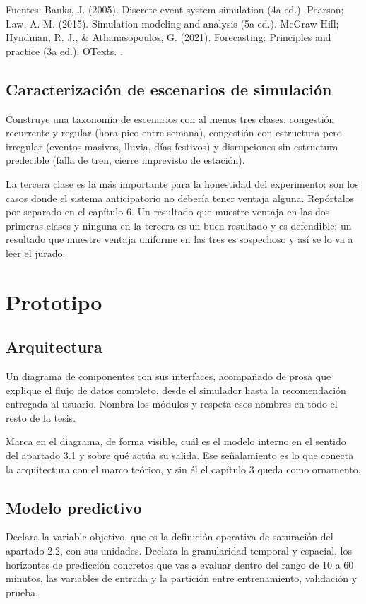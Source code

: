 \documentclass[letterpaper,12pt,oneside]{book}
\theoremstyle{definition}
\theoremstyle{plain}
\theoremstyle{remark}
\begin{document}
Fuentes: Banks, J. (2005). Discrete-event system simulation (4a ed.). Pearson; Law, A. M. (2015). Simulation modeling and analysis (5a ed.). McGraw-Hill; Hyndman, R. J., \& Athanasopoulos, G. (2021). Forecasting: Principles and practice (3a ed.). OTexts.
.
\section{Caracterización de escenarios de simulación}

Construye una taxonomía de escenarios con al menos tres clases: congestión recurrente y regular (hora pico entre semana), congestión con estructura pero irregular (eventos masivos, lluvia, días festivos) y disrupciones sin estructura predecible (falla de tren, cierre imprevisto de estación).

La tercera clase es la más importante para la honestidad del experimento: son los casos donde el sistema anticipatorio no debería tener ventaja alguna. Repórtalos por separado en el capítulo 6. Un resultado que muestre ventaja en las dos primeras clases y ninguna en la tercera es un buen resultado y es defendible; un resultado que muestre ventaja uniforme en las tres es sospechoso y así se lo va a leer el jurado.

\chapter{Prototipo}
\section{Arquitectura}
Un diagrama de componentes con sus interfaces, acompañado de prosa que explique el flujo de datos completo, desde el simulador hasta la recomendación entregada al usuario. Nombra los módulos y respeta esos nombres en todo el resto de la tesis.

Marca en el diagrama, de forma visible, cuál es el modelo interno en el sentido del apartado 3.1 y sobre qué actúa su salida. Ese señalamiento es lo que conecta la arquitectura con el marco teórico, y sin él el capítulo 3 queda como ornamento.

\section{Modelo predictivo}
Declara la variable objetivo, que es la definición operativa de saturación del apartado 2.2, con sus unidades. Declara la granularidad temporal y espacial, los horizontes de predicción concretos que vas a evaluar dentro del rango de 10 a 60 minutos, las variables de entrada y la partición entre entrenamiento, validación y prueba.
\end{document}
